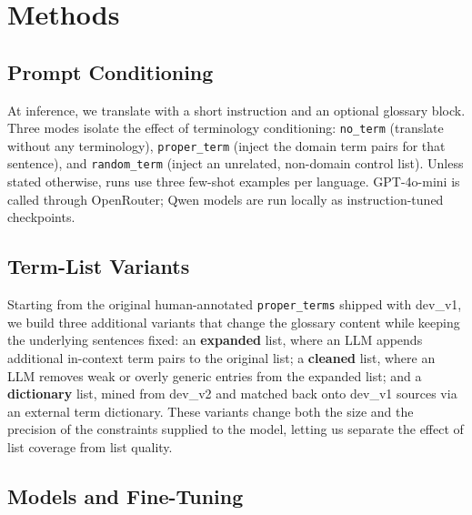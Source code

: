 \documentclass[11pt]{article}
\begin{document}
\section{Methods}
\label{sec:methods}


\subsection{Prompt Conditioning}
\label{sec:prompt-conditioning}

At inference, we translate with a short instruction and an optional glossary block. Three modes isolate the effect of terminology conditioning: \texttt{no\_term} (translate without any terminology), \texttt{proper\_term} (inject the domain term pairs for that sentence), and \texttt{random\_term} (inject an unrelated, non-domain control list). Unless stated otherwise, runs use three few-shot examples per language. GPT-4o-mini is called through OpenRouter; Qwen models are run locally as instruction-tuned checkpoints.

\subsection{Term-List Variants}
\label{sec:term-list-variants}

Starting from the original human-annotated \texttt{proper\_terms} shipped with dev\_v1, we build three additional variants that change the glossary content while keeping the underlying sentences fixed: an \textbf{expanded} list, where an LLM appends additional in-context term pairs to the original list; a \textbf{cleaned} list, where an LLM removes weak or overly generic entries from the expanded list; and a \textbf{dictionary} list, mined from dev\_v2 and matched back onto dev\_v1 sources via an external term dictionary. These variants change both the size and the precision of the constraints supplied to the model, letting us separate the effect of list coverage from list quality.

\subsection{Models and Fine-Tuning}
\label{sec:models-and-finetuning}
\end{document}
